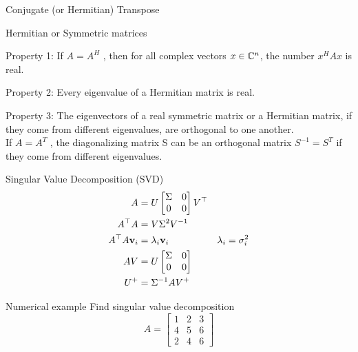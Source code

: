\documentclass[times,t]{beamer}
\begin{document}
\begin{frame}{Conjugate (or Hermitian) Transpose}
\end{frame}

\begin{frame}{Hermitian or Symmetric matrices}
\end{frame}

\begin{frame}
    Property 1: If $A = A^H$ , then for all complex vectors $x \in \mathbb{C}^n$, the number $x^HAx$ is real.
\end{frame}
\begin{frame}
    Property 2: Every eigenvalue of a Hermitian matrix is real.
\end{frame}

\begin{frame}
  Property 3: The eigenvectors of a real symmetric matrix or a Hermitian matrix, if
  they come from different eigenvalues, are orthogonal to one another.
  \\
  If $A = A^T$ , the diagonalizing matrix S can be an orthogonal matrix $S^{-1}
  = S^T$ if they come from different eigenvalues.
\end{frame}




\begin{frame}{Singular Value  Decomposition (SVD)}
  \begin{align}
    A  &=   U  \begin{bmatrix}\Sigma   &  0  \\   0  &  0 \end{bmatrix} V^\top \\
    A^\top A &= V \Sigma^2  V^{-1} \\
    A^\top A \mathbf{v}_i  &= \lambda_i \mathbf{v}_i & \lambda_i = \sigma_i^2\\
    A V   &= U \begin{bmatrix}\Sigma   &  0  \\   0  &  0 \end{bmatrix}\\
    U^+   &=  \Sigma^{-1}AV^+
    \end{align}
\end{frame}

\begin{frame}{Numerical example}
  Find singular value decomposition
  \[
    A   =  \begin{bmatrix}
      1 &   2  &  3  \\
      4 & 5 &   6 \\
      2 & 4 &   6
    \end{bmatrix}
  \]
\end{frame}
\end{document}
